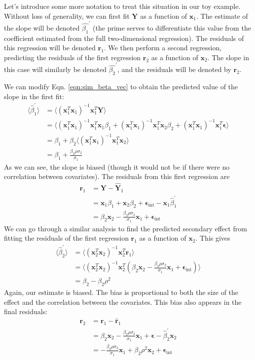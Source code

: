 Let's introduce some more notation to treat this situation in our toy example. Without loss of generality, we can first fit $\bm{Y}$ as a function of $\bm{x}_1$. The estimate of the slope will be denoted $\hat{\beta_1}^\prime$ (the prime serves to differentiate this value from the coefficient estimated from the full two-dimensional regression). The residuals of this regression will be denoted $\bm{r}_1$. We then perform a second regression, predicting the residuals of the first regression $\bm{r}_2$ as a function of $\bm{x}_2$. The slope in this case will similarly be denoted $\hat{\beta_2}^\prime$, and the residuals will be denoted by $\bm{r}_2$.

We can modify Eqn. \ref{eqn:sim_beta_vec} to obtain the predicted value of the slope in the first fit:
\begin{align*}
    \langle\hat{\beta}_1^\prime\rangle &= \langle(\bm{x}_1^T\bm{x}_1)^{-1}\bm{x}_1^T\bm{Y}\rangle\\
    &= \langle(\bm{x}_1^T\bm{x}_1)^{-1}\bm{x}_1^T\bm{x}_1\beta_1 + (\bm{x}_1^T\bm{x}_1)^{-1}\bm{x}_1^T\bm{x}_2\beta_2 + (\bm{x}_1^T\bm{x}_1)^{-1}\bm{x}_1^T\bm{\epsilon}\rangle\\
    &= \beta_1 + \beta_2\langle(\bm{x}_1^T\bm{x}_1)^{-1}\bm{x}_1^T\bm{x}_2\rangle\\
    &= \beta_1 + \frac{\beta_2\rho\sigma_2}{\sigma_1}
\end{align*}
As we can see, the slope is biased (though it would not be if there were no correlation between covariates). The residuals from this first regression are
\begin{align*}
    \bm{r}_1 &= \bm{Y}-\bm{\hat{Y}}_1 \\
    &= \bm{x}_1\beta_1 + \bm{x}_2\beta_2 + \bm{\epsilon}_\text{int}-\bm{x}_1\hat{\beta}_1^\prime\\
    &= \beta_2\bm{x}_2 - \frac{\beta_2\rho\sigma_2}{\sigma_1}\bm{x}_1 + \bm{\epsilon}_\text{int}
\end{align*}
We can go through a similar analysis to find the predicted secondary effect from fitting the residuals of the first regression $\bm{r}_1$ as a function of $\bm{x}_2$. This gives
\begin{align*}
    \langle\hat{\beta}_2^\prime\rangle &= \langle(\bm{x}_2^T\bm{x}_2)^{-1}\bm{x}_2^T\bm{r}_1\rangle\\
    &= \langle(\bm{x}_2^T\bm{x}_2)^{-1}\bm{x}_2^T(\beta_2\bm{x}_2 - \frac{\beta_2\rho\sigma_2}{\sigma_1}\bm{x}_1 + \bm{\epsilon}_\text{int})\rangle\\
    &= \beta_2 - \beta_2\rho^2
\end{align*}
Again, our estimate is biased. The bias is proportional to both the size of the effect and the correlation between the covariates. This bias also appears in the final residuals:
\begin{align*}
    \bm{r}_2 &= \bm{r}_1 - \bm{\hat{r}}_1\\
    &= \beta_2\bm{x}_2 - \frac{\beta_2\rho\sigma_2}{\sigma_1}\bm{x}_1 + \bm{\epsilon} - \hat{\beta}_2^\prime\bm{x}_2\\
    &= - \frac{\beta_2\rho\sigma_2}{\sigma_1}\bm{x}_1 + \beta_2\rho^2\bm{x}_2 + \bm{\epsilon}_\text{int}
\end{align*}

